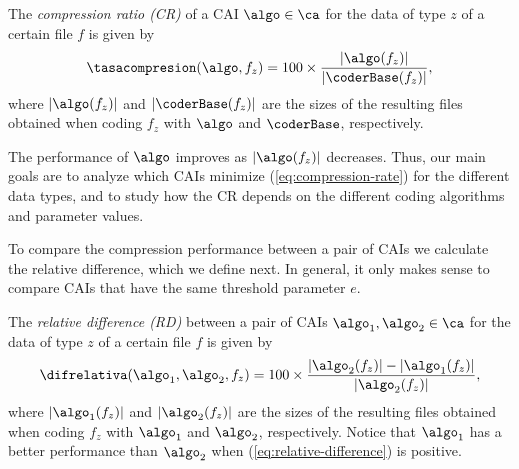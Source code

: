 \vspace{+2pt}
\begin{defcion}
The \textit{compression ratio (CR)} of a CAI $\algo \in \ca$ for the data of type $z$ of a certain file $f$ is given by
\vspace{-5pt}
\begin{equation}
\label{eq:compression-rate}
\tasacompresion(\algo, f_z) = 100\times\frac{|\algo(f_z)|}{|\coderBase(f_z)|},
\end{equation}
where $|\algo(f_z)|$ and $|\coderBase(f_z)|$ are the sizes of the resulting files obtained when coding $f_z$ with $\algo$ and $\coderBase$, respectively.
\end{defcion}


The performance of $\algo$ improves as $|\algo(f_z)|$ decreases. Thus, our main goals are to analyze which CAIs minimize (\ref{eq:compression-rate}) for the different data types, and to study how the CR depends on the different coding algorithms and parameter values.


To compare the compression performance between a pair of CAIs we calculate the relative difference, which we define next. In general, it only makes sense to compare CAIs that have the same threshold parameter $e$.


\vspace{+5pt}
\begin{defcion}
The \textit{relative difference (RD)} between a pair of CAIs $\algo_1, \algo_2 \in {\ca}$ for the data of type $z$ of a certain file $f$ is given by
\vspace{-5pt}
\begin{equation}
\label{eq:relative-difference}
\difrelativa(\algo_1, \algo_2, f_z)  =
100\times\frac{|\algo_2 (f_z)| - |\algo_1 (f_z)|}{ |\algo_2 (f_z)| },
\end{equation}
where $|\algo_1(f_z)|$ and $|\algo_2(f_z)|$ are the sizes of the resulting files obtained when coding $f_z$ with $\algo_1$ and $\algo_2$, respectively. Notice that $\algo_1$ has a better performance than $\algo_2$ when (\ref{eq:relative-difference}) is positive.
\end{defcion}

